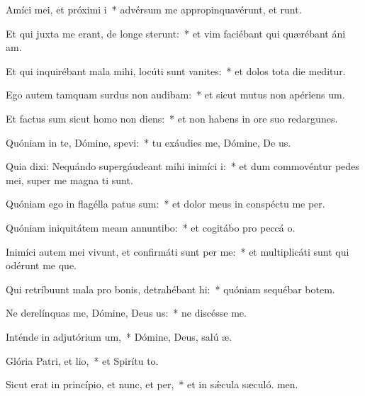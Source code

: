 \item Amíci mei, et próximi i~* advérsum me appropinquavérunt, et runt.
\item Et qui juxta me erant, de longe sterunt:~* et vim faciébant qui quærébant áni am.
\item Et qui inquirébant mala mihi, locúti sunt vanites:~* et dolos tota die meditur.
\item Ego autem tamquam surdus non audibam:~* et sicut mutus non apériens  um.
\item Et factus sum sicut homo non diens:~* et non habens in ore suo redargunes.
\item Quóniam in te, Dómine, spevi:~* tu exáudies me, Dómine, De us.
\item Quia dixi: Nequándo supergáudeant mihi inimíci i:~* et dum commovéntur pedes mei, super me magna ti sunt.
\item Quóniam ego in flagélla patus sum:~* et dolor meus in conspéctu me per.
\item Quóniam iniquitátem meam annuntibo:~* et cogitábo pro peccá o.
\item Inimíci autem mei vivunt, et confirmáti sunt per me:~* et multiplicáti sunt qui odérunt me que.
\item Qui retríbuunt mala pro bonis, detrahébant hi:~* quóniam sequébar botem.
\item Ne derelínquas me, Dómine, Deus us:~* ne discésse  me.
\item Inténde in adjutórium um,~* Dómine, Deus, salú æ.
\item Glória Patri, et lio,~* et Spirítu to.
\item Sicut erat in princípio, et nunc, et per,~* et in sǽcula sæculó. men.
